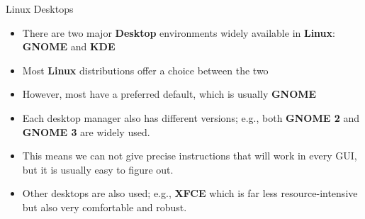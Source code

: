 \begin{frame}
   {Linux Desktops}

   \begin{itemize}
      \item There are two major \textbf{Desktop} environments
      widely available in \textbf{Linux}: \textbf{GNOME} and
      \textbf{KDE}
      \item
      Most \textbf{Linux} distributions offer a choice between
      the two
      \item
      However, most have a preferred default, which is usually
      \textbf{GNOME}
      \item
      Each desktop manager also has different versions; e.g.,
      both \textbf{GNOME 2} and \textbf{GNOME 3} are widely
      used.
      \item
      This means we can not give precise instructions that
      will work in every GUI, but it is usually easy to figure
      out.
      \item
      Other desktops are also used; e.g., \textbf{XFCE} which
      is far less resource-intensive but also very comfortable
      and robust.
   \end{itemize}

\end{frame}

\cprotect{}


